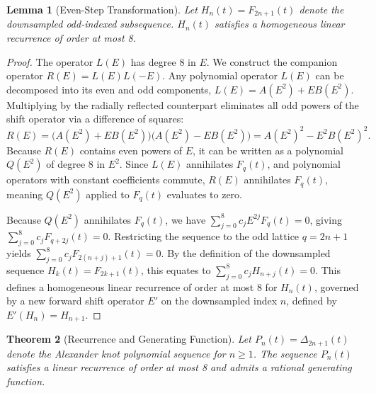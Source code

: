 \documentclass[11pt]{article}
\newtheorem{theorem}{Theorem}[section]
\newtheorem{lemma}[theorem]{Lemma}
\begin{document}
\begin{lemma}[Even-Step Transformation]\label{lem:even_step}
Let $H_n(t) = F_{2n+1}(t)$ denote the downsampled odd-indexed subsequence. $H_n(t)$ satisfies a homogeneous linear recurrence of order at most 8.
\end{lemma}

\begin{proof}
The operator $L(E)$ has degree 8 in $E$. We construct the companion operator $R(E) = L(E)L(-E)$. Any polynomial operator $L(E)$ can be decomposed into its even and odd components, $L(E) = A(E^2) + E B(E^2)$. Multiplying by the radially reflected counterpart eliminates all odd powers of the shift operator via a difference of squares:
\begin{equation*}
R(E) = \big( A(E^2) + E B(E^2) \big)\big( A(E^2) - E B(E^2) \big) = A(E^2)^2 - E^2 B(E^2)^2.
\end{equation*}
Because $R(E)$ contains even powers of $E$, it can be written as a polynomial $Q(E^2)$ of degree 8 in $E^2$. Since $L(E)$ annihilates $F_q(t)$, and polynomial operators with constant coefficients commute, $R(E)$ annihilates $F_q(t)$, meaning $Q(E^2)$ applied to $F_q(t)$ evaluates to zero.

Because $Q(E^2)$ annihilates $F_q(t)$, we have $\sum_{j=0}^8 c_j E^{2j} F_q(t) = 0$, giving $\sum_{j=0}^8 c_j F_{q+2j}(t) = 0$. Restricting the sequence to the odd lattice $q = 2n+1$ yields $\sum_{j=0}^8 c_j F_{2(n+j)+1}(t) = 0$. By the definition of the downsampled sequence $H_k(t) = F_{2k+1}(t)$, this equates to $\sum_{j=0}^8 c_j H_{n+j}(t) = 0$. This defines a homogeneous linear recurrence of order at most 8 for $H_n(t)$, governed by a new forward shift operator $E'$ on the downsampled index $n$, defined by $E'(H_n) = H_{n+1}$.
 
\end{proof}

\begin{theorem}[Recurrence and Generating Function]\label{thm:macro_gf}
Let $P_n(t) = \Delta_{2n+1}(t)$ denote the Alexander knot polynomial sequence for $n \ge 1$. The sequence $P_n(t)$ satisfies a linear recurrence of order at most 8 and admits a rational generating function.
\end{theorem}
\end{document}
